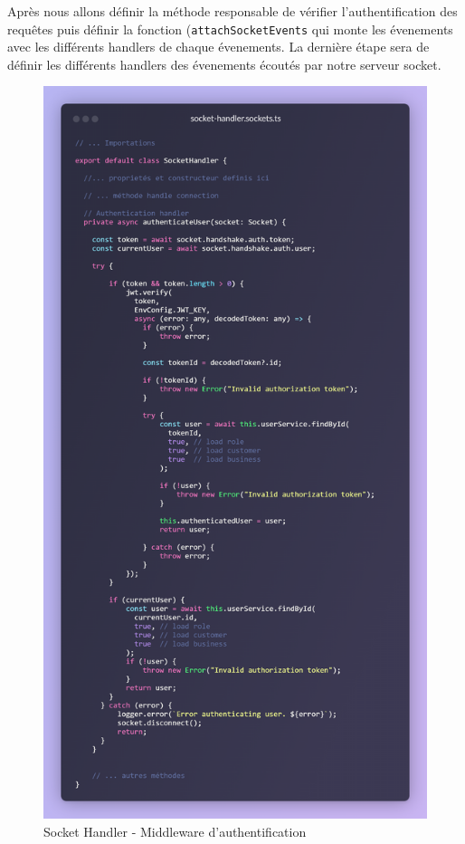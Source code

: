 \vspace{1cm}

Après nous allons définir la méthode responsable de vérifier l'authentification des requêtes puis définir la fonction (\verb|attachSocketEvents| qui monte les évenements avec les différents handlers de chaque évenements. La dernière étape sera de définir les différents handlers des évenements écoutés par notre serveur socket.

\begin{figure}[H]
    \centering
    \includegraphics[width=13cm]{assets/annexes/snippet (6).png}
    \caption{Socket Handler - Middleware d'authentification }
\end{figure}

